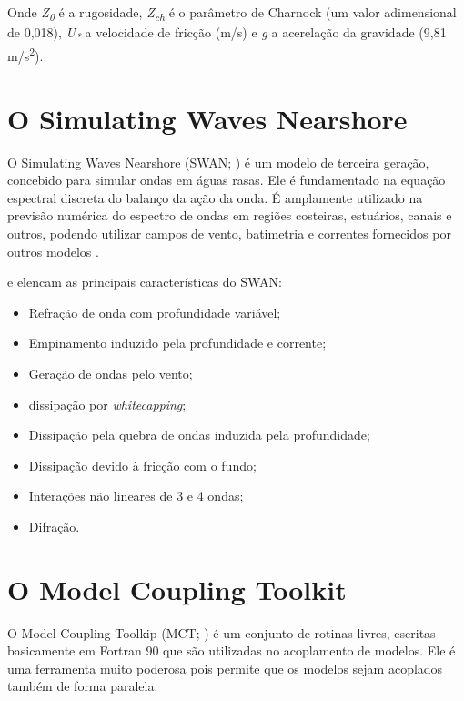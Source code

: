 \bigskip

\noindent Onde \textit{Z\textsubscript{0}} é a rugosidade, \textit{Z\textsubscript{ch}} é o parâmetro de Charnock (um valor adimensional de 0,018), \textit{U\textsubscript{*}} a velocidade de fricção (m/s) e \textit{g} a acerelação da gravidade (9,81 m/s\textsuperscript{2}).
\bigskip


\section{O Simulating Waves Nearshore}
\bigskip

\noindent O Simulating Waves Nearshore (SWAN; \cite{Booij1999,Booij1996}) é um modelo de terceira geração, concebido para simular ondas em águas rasas. Ele é fundamentado na equação espectral discreta do balanço da ação da onda. É amplamente utilizado na previsão numérica do espectro de ondas em regiões costeiras, estuários, canais e outros, podendo utilizar campos de vento, batimetria e correntes fornecidos por outros modelos \parencite{Booij1999,Booij1996}.
\bigskip

\noindent \textcite{Dasilva2013} e \textcite{Booij1999,Booij1996} elencam as principais características do SWAN:
\bigskip

\begin{itemize}
\item Refração de onda com profundidade variável;
\item Empinamento induzido pela profundidade e corrente;
\item Geração de ondas pelo vento;
\item dissipação por \textit{whitecapping};
\item Dissipação pela quebra de ondas induzida pela profundidade;
\item Dissipação devido à fricção com o fundo;
\item Interações não lineares de 3 e 4 ondas;
\item Difração.
\end{itemize}
\bigskip

\section{O Model Coupling Toolkit}
\bigskip

\noindent O Model Coupling Toolkip (MCT; \cite{Larson2005,Jacob2005,Warner2008}) é um conjunto de rotinas livres, escritas basicamente em Fortran 90 que são utilizadas no acoplamento de modelos. Ele é uma ferramenta muito poderosa pois permite que os modelos sejam acoplados também de forma paralela.
\bigskip

